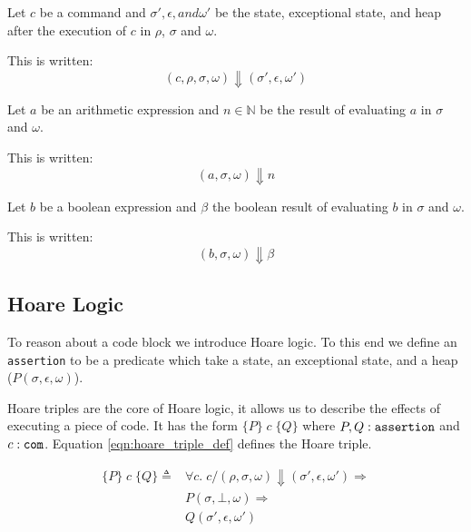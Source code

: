\begin{notation}
Let $c$ be a command and $\sigma',\epsilon, and \omega'$ be the state, exceptional state, and heap after the execution of $c$ in $\rho$, $\sigma$ and $\omega$.

This is written:
\begin{equation}
(c,\rho,\sigma,\omega) \Downarrow (\sigma',\epsilon,\omega')
\end{equation}
\end{notation}

\begin{notation}
Let $a$ be an arithmetic expression and $n\in\mathbb{N}$ be the result of evaluating $a$ in $\sigma$ and $\omega$.

This is written:
\begin{equation}
(a,\sigma,\omega) \Downarrow n
\end{equation}
\end{notation}

\begin{notation}
Let $b$ be a boolean expression and $\beta$ the boolean result of evaluating $b$ in $\sigma$ and $\omega$.

This is written:
\begin{equation}
(b,\sigma,\omega) \Downarrow \beta
\end{equation}
\end{notation}

\subsection{Hoare Logic}


To reason about a code block we introduce Hoare logic. To this end we define an \verb|assertion| to be a predicate which take a state, an exceptional state, and a heap ($P(\sigma,\epsilon,\omega)$).

Hoare triples are the core of Hoare logic, it allows us to describe the effects of executing a piece of code. It has the form $\{P\}\;c\;\{Q\}$ where $P,Q : \verb|assertion|$ and $c : \verb|com|$.
Equation \ref{eqn:hoare_triple_def} defines the Hoare triple.

\begin{equation}\label{eqn:hoare_triple_def}
\begin{split}
\{P\}\;c\;\{Q\} \triangleq
& \forall c.\; c / (\rho,\sigma,\omega) \Downarrow (\sigma', \epsilon, \omega') \Rightarrow\\
& P(\sigma,\bot,\omega) \Rightarrow\\
& Q(\sigma',\epsilon,\omega')
\end{split}
\end{equation}

